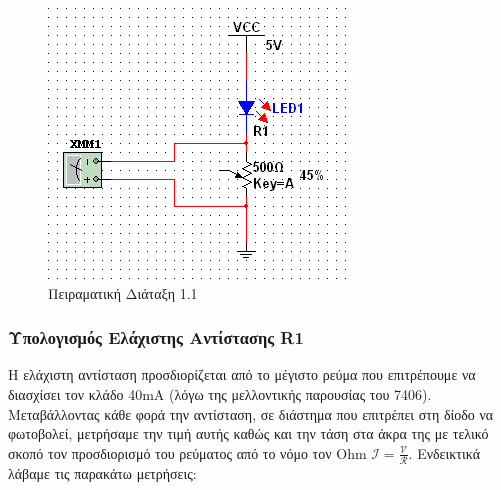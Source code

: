 \documentclass[a4paper,10pt]{article} \usepackage{anysize}
\begin{document}
\begin{figure}[H] 
\caption{Πειραματική Διάταξη 1.1} 
\centering
\includegraphics[scale=0.9]{files/peirama1.1.png} 
\end{figure}

\subsubsection*{\textnormal{Υπολογισμός Ελάχιστης Αντίστασης R1}} Η ελάχιστη
αντίσταση προσδιορίζεται από το μέγιστο ρεύμα που επιτρέπουμε να διασχίσει τον
κλάδο 40mA (λόγω της μελλοντικής παρουσίας του 7406). Μεταβάλλοντας κάθε φορά
την αντίσταση, σε διάστημα που επιτρέπει στη δίοδο να φωτοβολεί, μετρήσαμε την
τιμή αυτής καθώς και την τάση στα άκρα της με τελικό σκοπό τον προσδιορισμό
του ρεύματος από το νόμο τον Ohm \begin{math} \mathcal{
I=\frac{V}{R}}\end{math}.  Ενδεικτικά λάβαμε τις παρακάτω μετρήσεις:
\end{document}

